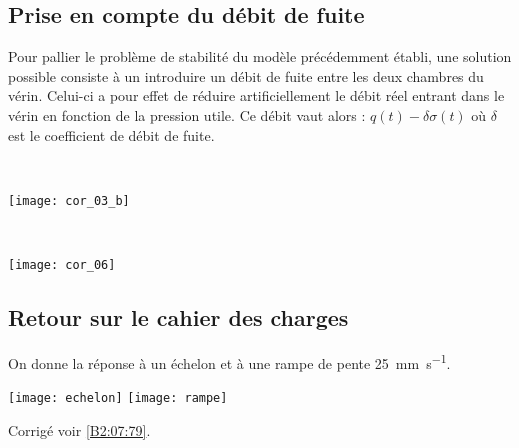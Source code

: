 \subsection*{Prise en compte du débit de fuite} 
\ifprof
\else

Pour pallier le problème de stabilité du modèle précédemment établi, une solution possible consiste à un introduire un débit de fuite entre les deux chambres du vérin. Celui-ci a pour effet de réduire artificiellement le débit réel entrant dans le vérin en fonction de la pression utile. Ce débit vaut alors : $q(t)-\delta \sigma (t)$  où $\delta$ est le coefficient de débit de fuite.
\fi

\ifprof
\newpage
\else \fi

\ifprof
\begin{corrige} ~\\
\begin{center}
\texttt{[image: cor\_03\_b]}
\end{center}
\end{corrige}
\else
\fi


\ifprof
\begin{corrige} ~\\
\begin{center}
\texttt{[image: cor\_06]}
\end{center}
\end{corrige}
\else
\fi
\subsection*{Retour sur le cahier des charges}
On donne la réponse à un échelon et à une rampe de pente \SI{25}{mm.s^{-1}}.



\begin{center}
\texttt{[image: echelon]}
\texttt{[image: rampe]}
\end{center}




\ifprof
\else
\begin{flushright}
\footnotesize{Corrigé  voir \ref{B2:07:79}.}
\end{flushright}%
\fi